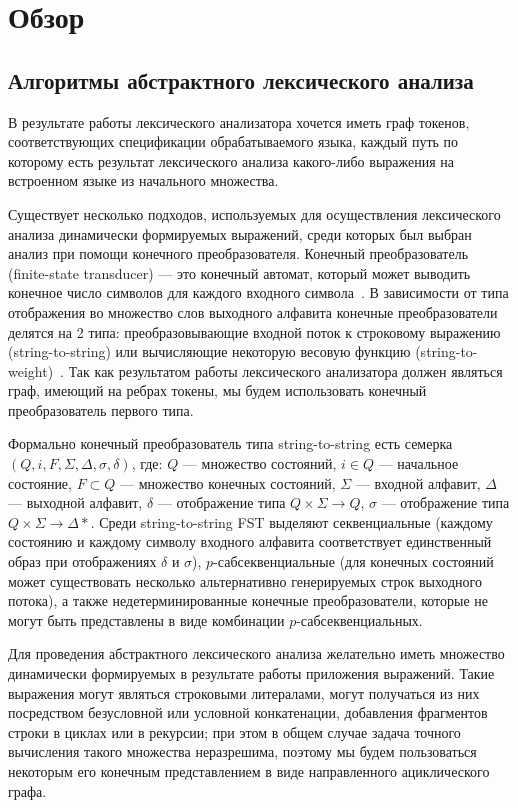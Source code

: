 \section{Обзор}
\subsection{Алгоритмы абстрактного лексического анализа}

В результате работы лексического анализатора хочется иметь граф токенов, 
соответствующих спецификации обрабатываемого языка, каждый путь по которому есть 
результат лексического анализа какого-либо выражения на встроенном языке из 
начального множества.

Существует несколько подходов, используемых для осуществления лексического 
анализа динамически формируемых выражений, среди которых был выбран анализ при 
помощи конечного преобразователя. Конечный преобразователь (finite-state 
transducer) --- это конечный автомат, который может выводить конечное число 
символов для каждого входного символа~\cite{Martynenko}. В зависимости от типа 
отображения во множество слов выходного алфавита конечные преобразователи 
делятся на 2 типа: преобразовывающие входной поток к строковому выражению 
(string-to-string) или вычисляющие некоторую весовую функцию (string-to-weight)~\cite{FST}. 
Так как результатом работы лексического анализатора должен являться граф, 
имеющий на ребрах токены, мы будем использовать конечный преобразователь первого 
типа. 

Формально конечный преобразователь типа string-to-string есть семерка 
$(Q, i, F, \Sigma, \Delta, \sigma, \delta)$, где: $Q$ --- множество состояний,
$i\in Q$ --- начальное состояние, $F\subset Q$ --- множество конечных состояний, 
$\Sigma$ --- входной алфавит, $\Delta$ --- выходной алфавит, $\delta$ --- отображение 
типа $Q \times\Sigma\rightarrow Q$, $\sigma$ --- отображение типа $Q\times\Sigma\rightarrow\Delta*$. 
Среди string-to-string FST выделяют секвенциальные (каждому состоянию и каждому 
символу входного алфавита соответствует единственный образ при отображениях 
$\delta$ и $\sigma$), $p$-сабсеквенциальные (для конечных состояний может существовать 
несколько альтернативно генерируемых строк выходного потока), а также 
недетерминированные конечные преобразователи, которые не могут быть представлены 
в виде комбинации $p$-сабсеквенциальных. 

Для проведения абстрактного лексического анализа желательно иметь множество 
динамически формируемых в результате работы приложения выражений. Такие выражения 
могут являться строковыми литералами, могут получаться из них посредством 
безусловной или условной конкатенации, добавления фрагментов строки в циклах или 
в рекурсии; при этом в общем случае задача точного вычисления такого множества 
неразрешима, поэтому мы будем пользоваться некоторым его конечным представлением 
в виде направленного ациклического графа.

